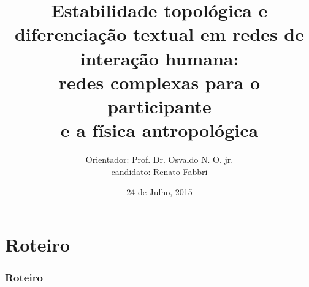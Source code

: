 \documentclass[10pt]{beamer}
\begin{document}
\title {\bfseries{\sc\large Estabilidade topológica e diferenciação textual
em redes de interação humana: \\
redes complexas para o participante\\
e a física antropológica
}}


\author[Renato Fabbri]{\small {Orientador: Prof. Dr. Osvaldo N. O. jr.\\
		candidato: Renato Fabbri\\
}}

\date{\small 24 de Julho, 2015} 
\begin{frame}
\titlepage
\end{frame}
\section*{Roteiro}
\begin{frame}
\frametitle{Roteiro}  
\tableofcontents
\end{frame}
\end{document}
